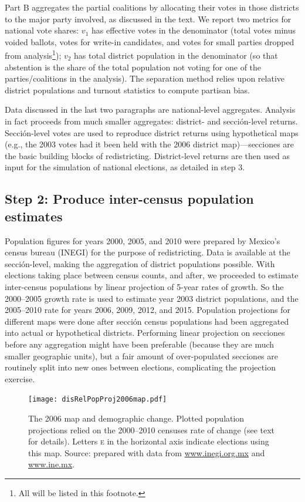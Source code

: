 \documentclass[letter,12pt]{article}
\begin{document}
Part B aggregates the partial coalitions by allocating their votes in those districts to the major party involved, as discussed in the text. We report two metrics for national vote shares: $v_1$ has effective votes in the denominator (total votes minus voided ballots, votes for write-in candidates, and votes for small parties dropped from analysis\footnote{All will be listed in this footnote.}); $v_2$ has total district population in the denominator (so that abstention is the share of the total population not voting for one of the parties/coalitions in the analysis). The separation method relies upon relative district populations and turnout statistics to compute partisan bias.

Data discussed in the last two paragraphs are national-level aggregates. Analysis in fact proceeds from much smaller aggregates: district- and secci\'on-level returns. Secci\'on-level votes are used to reproduce district returns using hypothetical maps (e.g., the 2003 votes had it been held with the 2006 district map)---secciones are the basic building blocks of redistricting. District-level returns are then used as input for the simulation of national elections, as detailed in step 3.  

\subsection*{Step 2: Produce inter-census population estimates}

Population figures for years 2000, 2005, and 2010 were prepared by Mexico's census bureau (INEGI) for the purpose of redistricting. Data is available at the secci\'on-level, making the aggregation of district populations possible. With elections taking place between census counts, and after, we proceeded to estimate inter-census populations by linear projection of 5-year rates of growth. So the 2000--2005 growth rate is used to estimate year 2003 district populations, and the 2005--2010 rate for years 2006, 2009, 2012, and 2015. Population projections for different maps were done after secci\'on census populations had been aggregated into actual or hypothetical districts. Performing linear projection on secciones before any aggregation might have been preferable (because they are much smaller geographic units), but a fair amount of over-populated secciones are routinely split into new ones between elections, complicating the projection exercise.

\begin{figure}
\centering 
  \texttt{[image: disRelPopProj2006map.pdf]} 
  \caption{The 2006 map and demographic change. Plotted population projections relied on the 2000--2010 censuses rate of change (see text for details). Letters \textsc{e} in the horizontal axis indicate elections using this map. Source: prepared with data from \url{www.inegi.org.mx} and \url{www.ine.mx}.}\label{F:disRelPop2006map}
\end{figure}
\end{document}
